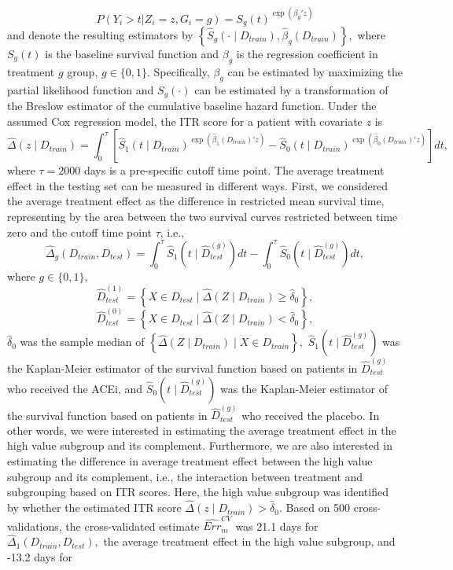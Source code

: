 \documentclass[12pt]{article}
\begin{document}
$$P(Y_i > t| Z_i=z, G_i=g)=S_g(t)^{\exp(\beta_g'z)}$$ 
and denote the resulting estimators by $\left\{\hat{S}_g(\cdot \mid D_{train}), \hat{\beta}_g(D_{train})\right\}, $ where $S_g(t)$ is the baseline survival function and $\beta_g$ is the regression coefficient in treatment $g$ group, $g\in \{0, 1\}.$  Specifically, $\beta_g$ can be estimated by maximizing the partial likelihood function and $S_g(\cdot)$ can be estimated by a transformation of the Breslow estimator of the cumulative baseline hazard function. Under the assumed Cox regression model, the ITR score for a patient with covariate $z$ is
$$ \widehat{\Delta}(z \mid D_{train})=\int_0^\tau \left[\hat{S}_1(t\mid D_{train})^{\exp(\hat{\beta}_1(D_{train})'z)}-\hat{S}_0(t \mid D_{train})^{\exp(\hat{\beta}_0(D_{train})'z)}\right]dt,$$
where $\tau=2000$ days is a pre-specific cutoff time point.  The average treatment effect in the testing set can be measured in different ways. First, we considered the average treatment effect as the difference in restricted mean survival time, representing by the area between the two survival curves restricted between time zero and the cutoff time point $\tau$, i.e., 
$$\hat{\Delta}_g(D_{train}, D_{test})= \int_0^\tau \hat{S}_{1}(t \mid \hat{D}_{test}^{(g)})dt- \int_0^\tau \hat{S}_{0}(t \mid \hat{D}_{test}^{(g)})dt,$$
where $g\in \{0, 1\},$ 
$$\hat{D}_{test}^{(1)}=\left\{ X\in D_{test} \mid \hat{\Delta}(Z \mid D_{train})\ge \hat{\delta}_0\right\},$$
$$\hat{D}_{test}^{(0)}=\left\{ X\in D_{test} \mid \hat{\Delta}(Z \mid D_{train})< \hat{\delta}_0\right\},$$ 
$\hat{\delta}_0$ was the sample median of $\left\{\widehat{\Delta}(Z\mid D_{train}) \mid X\in D_{train}\right\},$ $\hat{S}_{1}(t\mid \hat{D}_{test}^{(g)})$ was the Kaplan-Meier estimator of the survival function based on patients in $\hat{D}_{test}^{(g)}$ who received the ACEi, and $\hat{S}_{0}(t \mid \hat{D}_{test}^{(g)})$ was the Kaplan-Meier estimator of the survival function based on patients in $\hat{D}_{test}^{(g)}$ who received the placebo.  In other words, we were interested in estimating the average treatment effect in the high value subgroup and its complement. Furthermore, we are also interested in estimating the difference in average treatment effect between the high value subgroup and its complement, i.e., the interaction between treatment and subgrouping based on ITR scores.  Here, the high value subgroup was identified by whether the estimated ITR score $\hat{\Delta}(z\mid D_{train})>\widehat{\delta}_0.$  Based on 500 cross-validations, the cross-validated estimate $\widehat{Err}^{CV}_m$ was 21.1 days for $\hat{\Delta}_1(D_{train}, D_{test}),$ the average treatment effect in the high value subgroup, and -13.2 days for 
\end{document}
